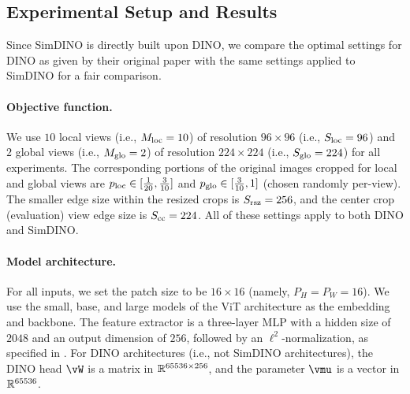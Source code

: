 \documentclass[../../book-main.tex]{subfiles}
\begin{document}
\subsection{Experimental Setup and Results} \label{sub:contrastive_learning_experiment_results}

Since SimDINO is directly built upon DINO, we compare the optimal settings for DINO as given by their original paper \citep{caron2021emerging} with the same settings applied to SimDINO for a fair comparison. 

\paragraph{Objective function.} We use \(10\) local views (i.e., \(M_{\mathrm{loc}} = 10\)) of resolution \(96 \times 96\) (i.e., \(S_{\mathrm{loc}} = 96\)) and \(2\) global views (i.e., \(M_{\mathrm{glo}} = 2\)) of resolution \(224 \times 224\) (i.e., \(S_{\mathrm{glo}} = 224\)) for all experiments. The corresponding portions of the original images cropped for local and global views are \(p_{\mathrm{loc}} \in [\frac{1}{20}, \frac{3}{10}]\) and \(p_{\mathrm{glo}} \in [\frac{3}{10}, 1]\) (chosen randomly per-view). The smaller edge size within the resized crops is \(S_{\mathrm{rsz}} = 256\), and the center crop (evaluation) view edge size is \(S_{\mathrm{cc}} = 224\). All of these settings apply to both DINO and SimDINO.

\paragraph{Model architecture.} For all inputs, we set the patch size to be \(16 \times 16\) (namely, \(P_{H} = P_{W} = 16\)). We use the small, base, and large models of the ViT \citep{dosovitskiy2020image} architecture as the embedding and backbone. The feature extractor is a three-layer MLP with a hidden size of \(2048\) and an output dimension of \(256\), followed by an \(\ell^{2}\)-normalization, as specified in . For DINO architectures (i.e., not SimDINO architectures), the DINO head \(\vW\) is a matrix in \(\mathbb{R}^{65536 \times 256}\), and the parameter \(\vmu\) is a vector in \(\mathbb{R}^{65536}\). 
\end{document}
